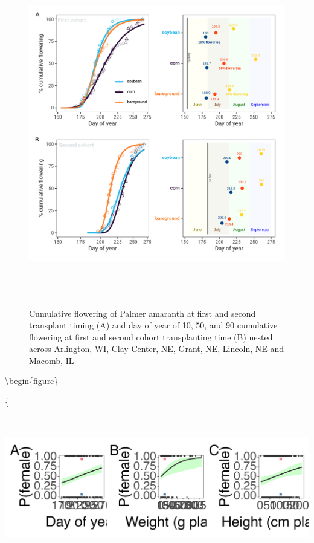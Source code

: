 \documentclass[utf8]{frontiersSCNS}
\begin{document}
\begin{figure}

{\centering \includegraphics[width=150mm,height=150mm]{../data analysis/figures/Figure 4} 

}

\caption{Cumulative flowering of Palmer amaranth at first and second transplant timing (A) and day of year of 10, 50, and 90 cumulative flowering at first and second cohort transplanting time (B) nested across Arlington, WI, Clay Center, NE, Grant, NE, Lincoln, NE and Macomb, IL}\label{fig:Figure-4}
\end{figure}

\textbackslash begin\{figure\}

\{\centering \includegraphics[width=170mm,height=70mm]{../data analysis/figures/Figure 5}
\end{document}
